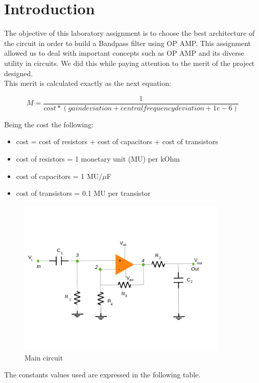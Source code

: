 \newpage
\section{Introduction}
\label{sec:introduction}

The objective of this laboratory assignment is to choose the best architecture of the circuit in order to build a Bandpass filter using OP AMP. This assignment allowed us to deal with important concepts such as OP AMP and its diverse utility in circuits. We did this while paying attention to the merit of the project designed.\\
This merit is calculated exactly as the next equation:

\begin{equation} 
M = \frac{1}{cost * (gain deviation + central frequency deviation + 1e-6)}
\label{eq1}
\end{equation}

Being the cost the following:
\begin{itemize}
	\item cost = cost of resistors  + cost of capacitors + cost of transistors
	\item cost of resistors = 1 monetary unit (MU) per kOhm
	\item cost of capacitors = 1 MU/$\mu$F
	\item cost of transistors = 0.1 MU per transistor
	
\end{itemize}

\begin{figure}[H] 
\centering
\includegraphics[width= 10cm]{circuito5.pdf} 
\caption{Main circuit}
\label{first}
\end{figure}

The constants values used are expressed in the following table.

